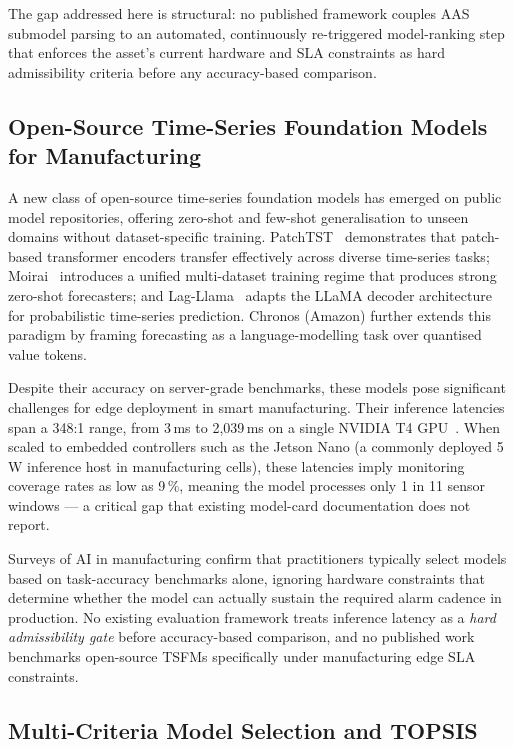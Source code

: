 \documentclass[12pt,a4paper]{article}
\begin{document}
The gap addressed here is structural: no published framework couples
AAS submodel parsing to an automated, continuously re-triggered
model-ranking step that enforces the asset's current hardware and
SLA constraints as hard admissibility criteria before any
accuracy-based comparison.

\subsection{Open-Source Time-Series Foundation Models for Manufacturing}
\label{subsec:rel-tsfm}

A new class of open-source time-series foundation models has emerged
on public model repositories, offering zero-shot and few-shot
generalisation to unseen domains without dataset-specific training.
PatchTST~\cite{Nie2023PatchTST} demonstrates that patch-based
transformer encoders transfer effectively across diverse time-series
tasks; Moirai~\cite{Woo2024Moirai} introduces a unified multi-dataset
training regime that produces strong zero-shot forecasters; and
Lag-Llama~\cite{Rasul2023LagLlama} adapts the LLaMA decoder
architecture for probabilistic time-series prediction.
Chronos (Amazon) further extends this paradigm by framing
forecasting as a language-modelling task over quantised value tokens.

Despite their accuracy on server-grade benchmarks, these models
pose significant challenges for edge deployment in smart
manufacturing.
Their inference latencies span a 348:1 range, from 3\,ms to
2{,}039\,ms on a single NVIDIA T4 GPU~\cite{Bifet2007ADWIN}.
When scaled to embedded controllers such as the Jetson Nano (a
commonly deployed 5\,W inference host in manufacturing cells), these
latencies imply monitoring coverage rates as low as 9\,\%,
meaning the model processes only 1 in 11 sensor windows --- a
critical gap that existing model-card documentation does not
report.

Surveys of AI in manufacturing confirm that practitioners typically
select models based on task-accuracy benchmarks alone, ignoring
hardware constraints that determine whether the model can actually
sustain the required alarm cadence in production.
No existing evaluation framework treats inference latency as a
\emph{hard admissibility gate} before accuracy-based comparison,
and no published work benchmarks open-source TSFMs specifically
under manufacturing edge SLA constraints.

\subsection{Multi-Criteria Model Selection and TOPSIS}
\label{subsec:rel-mcdm}
\end{document}
